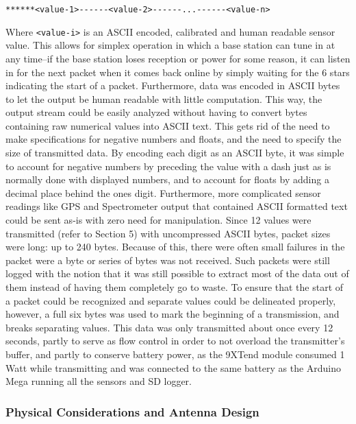 \documentclass[12pt,]{article}
\begin{document}
\texttt{******\textless{}value-1\textgreater{}-\/-\/-\/-\/-\/-\textless{}value-2\textgreater{}-\/-\/-\/-\/-\/-...-\/-\/-\/-\/-\/-\textless{}value-n\textgreater{}}

Where \texttt{\textless{}value-i\textgreater{}} is an ASCII encoded,
calibrated and human readable sensor value. This allows for simplex
operation in which a base station can tune in at any time--if the base
station loses reception or power for some reason, it can listen in for
the next packet when it comes back online by simply waiting for the 6
stars indicating the start of a packet. Furthermore, data was encoded in
ASCII bytes to let the output be human readable with little computation.
This way, the output stream could be easily analyzed without having to
convert bytes containing raw numerical values into ASCII text. This gets
rid of the need to make specifications for negative numbers and floats,
and the need to specify the size of transmitted data. By encoding each
digit as an ASCII byte, it was simple to account for negative numbers by
preceding the value with a dash just as is normally done with displayed
numbers, and to account for floats by adding a decimal place behind the
ones digit. Furthermore, more complicated sensor readings like GPS and
Spectrometer output that contained ASCII formatted text could be sent
as-is with zero need for manipulation. Since 12 values were transmitted
(refer to Section 5) with uncompressed ASCII bytes, packet sizes were
long: up to 240 bytes. Because of this, there were often small failures
in the packet were a byte or series of bytes was not received. Such
packets were still logged with the notion that it was still possible to
extract most of the data out of them instead of having them completely
go to waste. To ensure that the start of a packet could be recognized
and separate values could be delineated properly, however, a full six
bytes was used to mark the beginning of a transmission, and breaks
separating values. This data was only transmitted about once every 12
seconds, partly to serve as flow control in order to not overload the
transmitter's buffer, and partly to conserve battery power, as the
9XTend module consumed 1 Watt while transmitting and was connected to
the same battery as the Arduino Mega running all the sensors and SD
logger.

\subsubsection{Physical Considerations and Antenna
Design}\label{physical-considerations-and-antenna-design}
\end{document}

